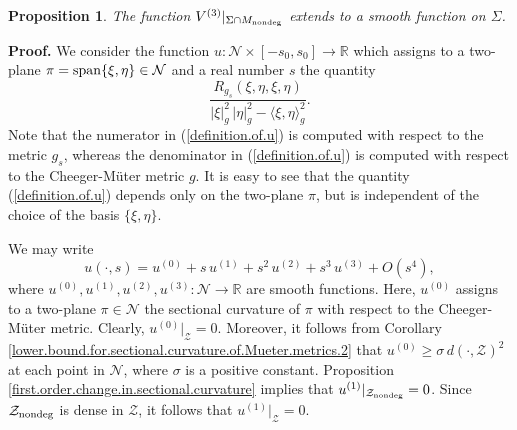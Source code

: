 \documentclass[11pt]{amsart}
\newtheorem{proposition}[theorem]{Proposition}
\theoremstyle{definition}
\begin{document}
\begin{proposition}
\label{V3.extends.smoothly}
The function $V^{(3)}|_{\Sigma \cap M_{\text{\rm nondeg}}}$ extends to a smooth function on $\Sigma$. 
\end{proposition}

\textbf{Proof.}
We consider the function $u: \mathcal{N} \times [-s_0,s_0] \to \mathbb{R}$ which assigns to a two-plane $\pi = \text{\rm span}\{\xi,\eta\} \in \mathcal{N}$ and a real number $s$ the quantity 
\begin{equation} 
\label{definition.of.u}
\frac{R_{g_s}(\xi,\eta,\xi,\eta)}{|\xi|_g^2 \, |\eta|_g^2 - \langle \xi,\eta \rangle_g^2}. 
\end{equation}
Note that the numerator in (\ref{definition.of.u}) is computed with respect to the metric $g_s$, whereas the denominator in (\ref{definition.of.u}) is computed with respect to the Cheeger-M\"uter metric $g$. It is easy to see that the quantity (\ref{definition.of.u}) depends only on the two-plane $\pi$, but is independent of the choice of the basis $\{\xi,\eta\}$. 

We may write 
\begin{equation} 
\label{Taylor.expansion.of.u}
u(\cdot,s) = u^{(0)} + s \, u^{(1)} + s^2 \, u^{(2)} + s^3 \, u^{(3)} + O(s^4), 
\end{equation}
where $u^{(0)},u^{(1)},u^{(2)},u^{(3)}: \mathcal{N} \to \mathbb{R}$ are smooth functions. Here, $u^{(0)}$ assigns to a two-plane $\pi \in \mathcal{N}$ the sectional curvature of $\pi$ with respect to the Cheeger-M\"uter metric. Clearly, $u^{(0)}|_{\mathcal{Z}} = 0$. Moreover, it follows from Corollary \ref{lower.bound.for.sectional.curvature.of.Mueter.metrics.2} that $u^{(0)} \geq \sigma \, d(\cdot,\mathcal{Z})^2$ at each point in $\mathcal{N}$, where $\sigma$ is a positive constant. Proposition \ref{first.order.change.in.sectional.curvature} implies that $u^{(1)}|_{\mathcal{Z}_{\text{\rm nondeg}}} = 0$. Since $\mathcal{Z}_{\text{\rm nondeg}}$ is dense in $\mathcal{Z}$, it follows that $u^{(1)}|_{\mathcal{Z}} = 0$.
\end{document}
